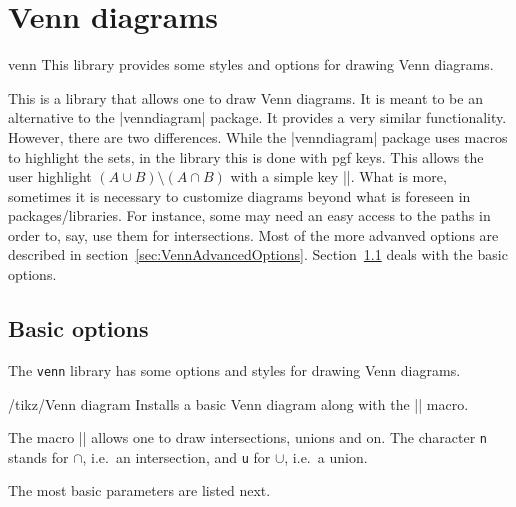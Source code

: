 \documentclass[a4paper]{ltxdoc}
\begin{document}
\section{Venn diagrams}
\begin{tikzlibrary}{venn}
    This library provides some styles and options for drawing Venn diagrams.
\end{tikzlibrary}

This is a library that allows one to draw Venn diagrams. It is meant to be an
alternative to the |venndiagram| package. It provides a very similar
functionality. However, there are two differences. While the |venndiagram|
package uses macros to highlight the sets, in the library this is done with pgf
keys. This allows the user highlight $(A\cup B)\setminus(A\cap B)$ with a simple
key ||. What is more, sometimes it is necessary to
customize diagrams beyond what is foreseen in packages/libraries. For instance,
some may need an easy access to the paths in order to, say, use them for
intersections. Most of the more advanved options are described in
section~\ref{sec:VennAdvancedOptions}. Section~\ref{sec:VennBasicOptions} deals
with the basic options.

\subsection{Basic options}
\label{sec:VennBasicOptions}

The \texttt{venn} library has some options and styles for drawing Venn diagrams.
\begin{key}{/tikz/Venn diagram}
        Installs a basic Venn diagram along with the |\Venn| macro.
\end{key}

The macro |\Venn| allows one to draw intersections, unions and on. The character
\texttt{n} stands for $\cap$, i.e.\ an intersection, and \texttt{u} for $\cup$,
i.e.\ a union.

\begin{codeexample}[width=5cm]
\end{codeexample}

The most basic parameters are listed next.
\end{document}
